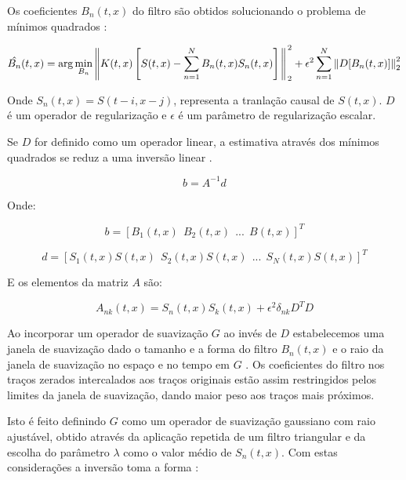 Os coeficientes $B_n(t,x)$ do filtro são obtidos
solucionando o problema de mínimos quadrados \cite{liu11}:

\begin{equation}
\label{eq:4.1}
\hat{B_n}(t,x) = \arg \min_{B_n} \left \rVert K(t,x) \left [ S(t,x) - \sum^N_{n=1}B_n(t,x)S_n(t,x) \right ] \right \Arrowvert^2_2 
+ \epsilon^2 \sum^N_{n=1} \left \rVert D [ B_n(t,x) ] \right \Arrowvert^2_2
\end{equation}

Onde $S_n(t,x) = S(t-i,x-j)$, representa a tranlação causal de $S(t,x)$. 
$D$ é um operador de regularização e $\epsilon$ é um parâmetro de regularização escalar.

Se $D$ for definido como um operador linear, a estimativa através dos mínimos quadrados se reduz a uma
inversão linear \cite{liu11, fomel2009}.

\begin{equation}
\label{eq:4.2}
b = A^{-1} d
\end{equation}

Onde:

\begin{equation}
\label{eq:4.3}
 b = \left[ B_1(t,x)\:\: B_2(t,x)\:\: ...\:\: B(t,x) \right]^T
\end{equation}

\begin{equation}
\label{eq:4.4}
 d = \left[ S_1(t,x)S(t,x)\:\: S_2(t,x)S(t,x)\:\: ... \:\: S_N(t,x)S(t,x) \right]^T
\end{equation}

E os elementos da matriz $A$ são:

\begin{equation}
\label{eq:4.5}
 A_{nk}(t,x) = S_n(t,x)S_k(t,x) + \epsilon^2 \delta_{nk}D^TD
\end{equation}

Ao incorporar um operador de suavização $G$ ao invés de $D$ estabelecemos uma janela de suavização
dado o tamanho e a forma do filtro $B_n(t,x)$ e o raio da janela de suavização no espaço e no tempo em $G$ \cite{fomel2007}.
Os coeficientes do filtro nos traços zerados intercalados aos traços originais estão assim restringidos pelos limites
da janela de suavização, dando maior peso aos traços mais próximos.

Isto é feito definindo $G$ como um operador de suavização gaussiano com raio ajustável, obtido através da
aplicação repetida de um filtro triangular e da escolha do parâmetro $\lambda$ como o valor médio de $S_n(t,x)$.
Com estas considerações a inversão toma a forma \cite{liu11, fomel2007}:

